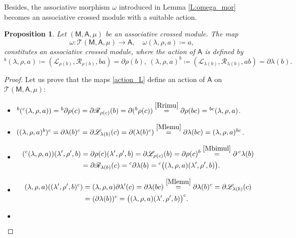 \documentclass[12pt,reqno]{amsart}
\theoremstyle{plain}
\newtheorem{proposition}[theorem]{Proposition}
\theoremstyle{definition}
\theoremstyle{remark}
\def\lam{\lambda}
\newcommand{\A}{\ensuremath{\mathsf{A}}}
\newcommand{\MM}{\ensuremath{\mathsf{M}}}
\newcommand{\T}{\ensuremath{\mathcal{T}}}
\newcommand{\LL}{\ensuremath{\mathcal{L}}}
\newcommand{\RR}{\ensuremath{\mathcal{R}}}
\numberwithin{equation}{section}
\begin{document}
Besides, the associative morphism $\omega$ introduced in Lemma \ref{L:omega_mor} becomes an associative crossed module with a suitable action.
\begin{proposition} \label{P:omega}
	Let $(\MM,\A,\mu)$	be an   associative crossed module.  The map 
\[	\omega \colon \T(\MM,\A,\mu) \rightarrow   \A, \quad   \omega(\lam,\rho,a) \coloneqq a,\]
 constitutes an  associative crossed module, where the action of $\A$ is defined by 
		\begin{equation}\label{action_L}
			{}^b  (\lam,\rho,a) \coloneqq  (\LL_{\rho(b)},\RR_{\rho(b)}, ba ) =\partial \rho (b), \ (\lam,\rho,a)^b  \coloneqq   (\LL_{\lam(b)},\RR_{\lam(b)},  ab)=\partial \lam (b). 
		\end{equation}	
\end{proposition}
\begin{proof}
	Let us prove that the maps \eqref{action_L} define an action of $\A$ on $\T(\MM,\A,\mu)$:
	\begin{itemize}
		\item[\eqref{A1}:] ${}^{b}({}^{c}(\lambda,\rho,a))={}^{b}\partial\rho(c)=\partial\RR_{\rho(c)}(b)=\partial({}^{b}\rho(c))
		\stackrel{\eqref{Rrimu}}{=}\partial\rho(bc)={}^{bc}(\lambda,\rho,a)$.
		\item[\eqref{A2}:] $((\lambda,\rho,a)^{b})^{c}=\partial\lambda(b)^{c}=\partial\LL_{\lambda(b)}(c)=\partial(\lambda(b)^{c})
		\stackrel{\eqref{Mlemu}}{=}\partial\lambda(bc)=(\lambda,\rho,a)^{bc}$.
		\item[\eqref{A3}:]
		\begin{align*}
			({}^{c}(\lambda,\rho,a))(\lambda',\rho',b)&=\partial\rho(c)(\lambda',\rho',b)=\partial\LL_{\rho(c)}(b)
			=\partial\rho(c)^{b}\stackrel{\eqref{Mbimul}}{=}\partial\,{}^{c}\lambda(b)\\
			&=\partial\RR_{\lambda(b)}(c)={}^{c}\partial\lambda(b)={}^{c}\big((\lambda,\rho,a)(\lambda',\rho',b)\big).
		\end{align*}
		\item[\eqref{A4}:] 
		\begin{align*}
			(\lambda,\rho,a)((\lambda',\rho',b)^{c})&=(\lambda,\rho,a)\partial\lambda'(c)=\partial\lambda(bc)
			\stackrel{\eqref{Mlemu}}{=}\partial\lambda(b)^{c}=\partial\LL_{\lambda(b)}(c)\\
			&=(\partial\lambda(b))^{c}=\big((\lambda,\rho,a)(\lambda',\rho',b)\big)^{c}.
		\end{align*}
		\item[\eqref{A5}:] 
		\begin{align*}

\end{align*}
\end{itemize}
\end{proof}
\end{document}
